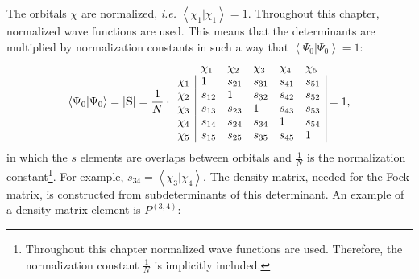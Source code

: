 The orbitals $\chi$ are normalized, \textit{i.e.} $\left< \chi_1 | \chi_1 \right> = 1$. Throughout this chapter, normalized wave functions are used. This means that the determinants are multiplied by normalization constants in such a way that $\left< \Psi_0 |  \Psi_0 \right> = 1$:
\begin{equation}
\left < \Psi_0 | \Psi_0 \right> = | \mathbf{S} | = \frac{1}{N} \cdot
\begin{array}{llllll}
 &  \chi_1 & \chi_2 & \chi_3 & \chi_4 & \chi_5 \\
 \chi_1 & \multicolumn{1}{|l}{ 1 } & s_{21} & s_{31} & s_{41} & \multicolumn{1}{l|}{ s_{51} } \\
 \chi_2 & \multicolumn{1}{|l}{ s_{12} } & 1 & s_{32} & s_{42} & \multicolumn{1}{l|}{ s_{52} } \\
 \chi_3 & \multicolumn{1}{|l}{ s_{13} } & s_{23} & 1 & s_{43} & \multicolumn{1}{l|}{ s_{53} } \\
 \chi_4 & \multicolumn{1}{|l}{ s_{14} } & s_{24} & s_{34} & 1 & \multicolumn{1}{l|}{ s_{54} } \\
 \chi_5 & \multicolumn{1}{|l}{ s_{15} } & s_{25} & s_{35} & s_{45} & \multicolumn{1}{l|}{ 1 }
\end{array} = 1,
\label{ch2.eq.s0g}
\end{equation}
in which the $s$ elements are overlaps between orbitals and $\frac{1}{N}$ is the normalization constant\footnote{Throughout this chapter normalized wave functions are used. Therefore, the normalization constant $\frac{1}{N}$ is implicitly included.}. For example, $s_{34} = \left< \chi_3 | \chi_4 \right>$. The density matrix, needed for the Fock matrix, is constructed from subdeterminants of this determinant. An example of a density matrix element is $P^{(3,4)}$:
